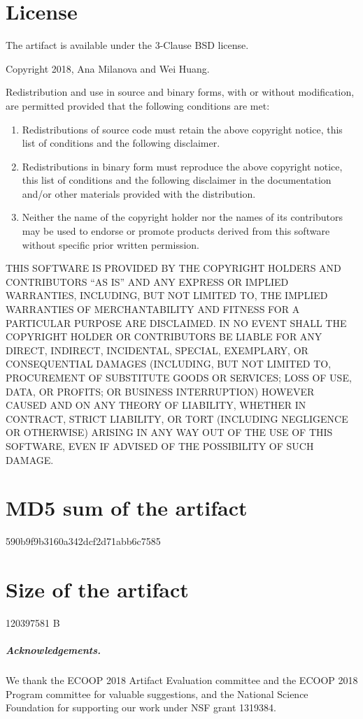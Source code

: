 \documentclass[a4paper,UKenglish]{darts-v2018}
\newcommand{\license}[1]{{\section{License}#1}}
\newcommand{\mdsum}[1]{{\section{MD5 sum of the artifact}#1}}
\newcommand{\artifactsize}[1]{{\section{Size of the artifact}#1}}
\begin{document}
\license{The artifact is available under the 3-Clause BSD license. 

Copyright 2018, Ana Milanova and Wei Huang.

Redistribution and use in source and binary forms, with or without modification, are permitted provided 
that the following conditions are met:

\begin{enumerate}
\item Redistributions of source code must retain the above copyright notice, this list of conditions and 
the following disclaimer.

\item Redistributions in binary form must reproduce the above copyright notice, this list of conditions 
and the following disclaimer in the documentation and/or other materials provided with the distribution.

\item Neither the name of the copyright holder nor the names of its contributors may be used to endorse 
or promote products derived from this software without specific prior written permission.
\end{enumerate}

THIS SOFTWARE IS PROVIDED BY THE COPYRIGHT HOLDERS AND CONTRIBUTORS ``AS IS'' AND ANY EXPRESS OR IMPLIED WARRANTIES, INCLUDING, BUT NOT LIMITED TO, THE IMPLIED WARRANTIES OF MERCHANTABILITY AND FITNESS FOR A PARTICULAR PURPOSE ARE DISCLAIMED. IN NO EVENT SHALL THE COPYRIGHT HOLDER OR CONTRIBUTORS BE LIABLE FOR ANY DIRECT, INDIRECT, INCIDENTAL, SPECIAL, EXEMPLARY, OR CONSEQUENTIAL DAMAGES (INCLUDING, BUT NOT LIMITED TO, PROCUREMENT OF SUBSTITUTE GOODS OR SERVICES; LOSS OF USE, DATA, OR PROFITS; OR BUSINESS INTERRUPTION) HOWEVER CAUSED AND ON ANY THEORY OF LIABILITY, WHETHER IN CONTRACT, STRICT LIABILITY, OR TORT (INCLUDING NEGLIGENCE OR OTHERWISE) ARISING IN ANY WAY OUT OF THE USE OF THIS SOFTWARE, EVEN IF ADVISED OF THE POSSIBILITY OF SUCH DAMAGE.
}

\mdsum{590b9f9b3160a342dcf2d71abb6c7585}

\artifactsize{120397581 B}

\subparagraph*{Acknowledgements.}

We thank the ECOOP 2018 Artifact Evaluation committee and the ECOOP 2018 Program committee for valuable suggestions,
and the National Science Foundation for supporting our work under NSF grant 1319384.


\end{document}
